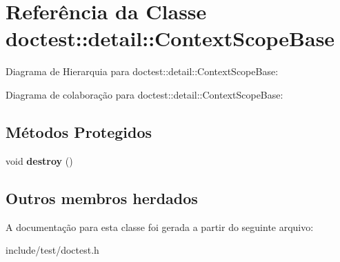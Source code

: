 \hypertarget{classdoctest_1_1detail_1_1ContextScopeBase}{}\section{Referência da Classe doctest\+:\+:detail\+:\+:Context\+Scope\+Base}
\label{classdoctest_1_1detail_1_1ContextScopeBase}


Diagrama de Hierarquia para doctest\+:\+:detail\+:\+:Context\+Scope\+Base\+:


Diagrama de colaboração para doctest\+:\+:detail\+:\+:Context\+Scope\+Base\+:
\subsection*{Métodos Protegidos}
\begin{DoxyCompactItemize}
\item 
\mbox{\label{classdoctest_1_1detail_1_1ContextScopeBase_a6f223de9a972b08bf1b9e9d2d99ab4c6}} 
void {\bfseries destroy} ()
\end{DoxyCompactItemize}
\subsection*{Outros membros herdados}


A documentação para esta classe foi gerada a partir do seguinte arquivo\+:\begin{DoxyCompactItemize}
\item 
include/test/doctest.\+h\end{DoxyCompactItemize}
